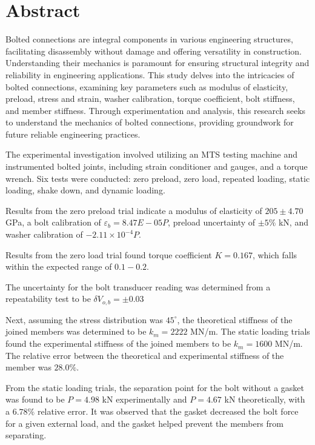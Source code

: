 \section*{Abstract}
    Bolted connections are integral components in various engineering structures, facilitating disassembly without damage and offering versatility in construction. Understanding their mechanics is paramount for ensuring structural integrity and reliability in engineering applications. This study delves into the intricacies of bolted connections, examining key parameters such as modulus of elasticity, preload, stress and strain, washer calibration, torque coefficient, bolt stiffness, and member stiffness. Through experimentation and analysis, this research seeks to understand the mechanics of bolted connections, providing groundwork for future reliable engineering practices.

    The experimental investigation involved utilizing an MTS testing machine and instrumented bolted joints, including strain conditioner and gauges, and a torque wrench. Six tests were conducted: zero preload, zero load, repeated loading, static loading, shake down, and dynamic loading. 

    Results from the zero preload trial indicate a modulus of elasticity of $205 \pm 4.70$ GPa, a bolt calibration of $\varepsilon_{b} = 8.47E-05 P$, preload uncertainty of $\pm 5\%$ kN, and washer calibration of $-2.11 \times 10^{-4}P$. 
    
    Results from the zero load trial found torque coefficient $K = 0.167$, which falls within the expected range of $0.1 - 0.2$. 
    
    The uncertainty for the bolt transducer reading was determined from a repeatability test to be $\delta V_{o, b} =\pm 0.03$
    
    Next, assuming the stress distribution was $45^{\circ}$, the theoretical stiffness of the joined members was determined to be $k_m = 2222$ MN/m. The static loading trials found the experimental stiffness of the joined members to be $k_m = 1600$ MN/m. The relative error between the theoretical and experimental  stiffness of the member was $28.0\%$. 

    From the static loading trials, the separation point for the bolt without a gasket was found to be $P = 4.98$ kN experimentally and $P = 4.67$ kN theoretically, with a $6.78\%$ relative error. It was observed that the gasket decreased the bolt force for a given external load, and the gasket helped prevent the members from separating.

